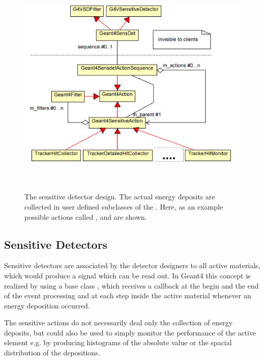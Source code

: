 \documentclass[10pt,a4paper]{article}
\begin{document}
\begin{figure}[h]
  \begin{center}
    \includegraphics[height=110mm] {DDG4-Sensitive-detector.png}
    \caption{The sensitive detector design. The actual energy deposits are 
        collected in user defined subclasses of the .
        Here, as an example possible actions called ,
         and  are shown.}
    \label{fig:ddg4-implementation-sensitive-detector}
  \end{center}
\end{figure}

\subsection{Sensitive Detectors}
\label{sec:ddg4-user-manual-geant4sensitivedetectors}

\noindent
Sensitive detectors are associated by the detector designers to all active 
materials, which would produce a signal which can be read out. In Geant4 this concept
is realized by using a base class , which receives 
a callback at the begin and the end of the event processing and at each step
inside the active material whenever an energy deposition occurred.

\noindent
The sensitive actions do not necessarily deal only the collection of energy 
deposits, but could also be used to simply monitor the performance of the
active element e.g. by producing histograms of the absolute value or the 
spacial distribution of the depositions.
\end{document}
